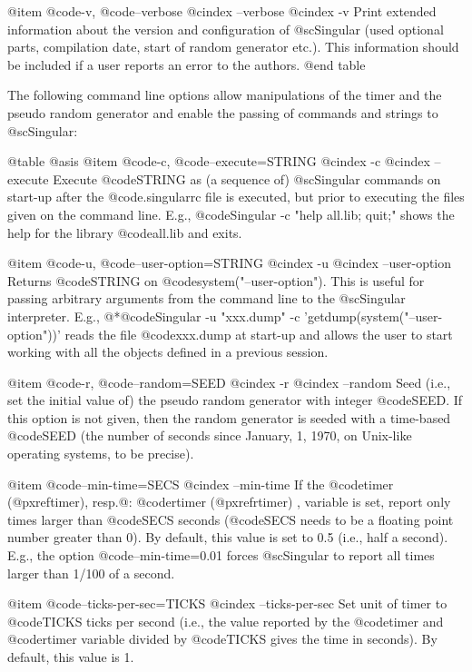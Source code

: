 @item @code{-v}, @code{--verbose}
@cindex --verbose
@cindex -v
Print extended information about the version and configuration of
@sc{Singular}  (used optional parts, compilation date, start of random
generator etc.). This information should be included if a user reports
an error to the authors.
@end table

The following command line options allow manipulations of the timer and
the pseudo random generator and enable the passing of commands and strings
to @sc{Singular}:

@table @asis
@item @code{-c}, @code{--execute=STRING}
@cindex -c
@cindex --execute
Execute @code{STRING} as (a sequence of) @sc{Singular} commands on
start-up after the @code{.singularrc} file is executed, but prior to
executing the files given on the command line.  E.g., @code{Singular -c
"help all.lib; quit;"} shows the help for the library @code{all.lib} and
exits.

@item @code{-u}, @code{--user-option=STRING}
@cindex -u
@cindex --user-option
Returns @code{STRING} on @code{system("--user-option")}. This is useful
for passing arbitrary arguments from the command line to the
@sc{Singular} interpreter.  E.g.,
@*@code{Singular -u "xxx.dump" -c 'getdump(system("--user-option"))'}
reads the file @code{xxx.dump} at
start-up and allows the user to start working with all the objects
defined in a previous session.

@item @code{-r}, @code{--random=SEED}
@cindex -r
@cindex --random
Seed (i.e., set the initial value of) the pseudo random generator with
integer @code{SEED}.  If this option is not given, then the random
generator is seeded with a time-based @code{SEED} (the number of
seconds since January, 1, 1970, on Unix-like operating systems, to be
precise).

@item @code{--min-time=SECS}
@cindex --min-time
If the @code{timer} (@pxref{timer}), resp.@:  @code{rtimer}
(@pxref{rtimer}) , variable is
set, report only
times larger than @code{SECS} seconds (@code{SECS} needs to be a
floating point number greater than 0).  By default, this value is set to
0.5 (i.e., half a second).  E.g., the option @code{--min-time=0.01}
forces @sc{Singular} to report all times larger than 1/100 of a
second.

@item @code{--ticks-per-sec=TICKS}
@cindex --ticks-per-sec
Set unit of timer to @code{TICKS} ticks per second (i.e., the value
reported by the @code{timer} and @code{rtimer} variable divided by
@code{TICKS} gives the time in seconds).  By default, this value is 1.

